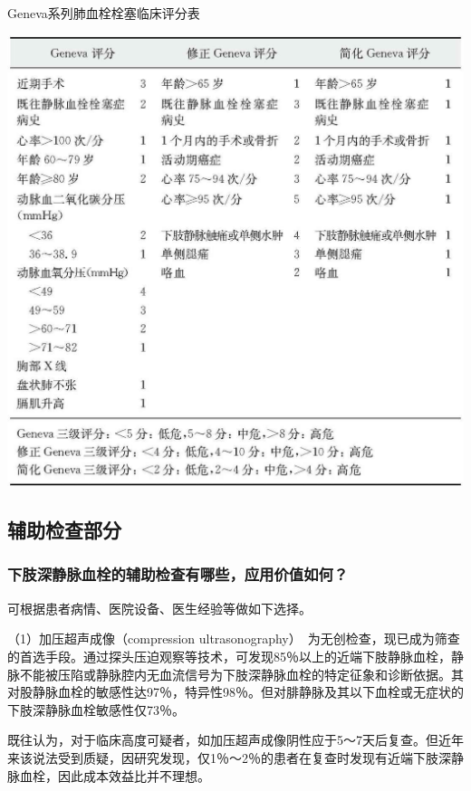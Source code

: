 \begin{table}[htbp]
\centering
\caption{Geneva系列肺血栓栓塞临床评分表}
\label{tab16-7}
\includegraphics[width=\textwidth,height=\textheight,keepaspectratio]{./images/Image00124.jpg}
\end{table}

\subsection{辅助检查部分}

\subsubsection{下肢深静脉血栓的辅助检查有哪些，应用价值如何？}

可根据患者病情、医院设备、医生经验等做如下选择。

（1）加压超声成像（compression
ultrasonography）　为无创检查，现已成为筛查的首选手段。通过探头压迫观察等技术，可发现85％以上的近端下肢静脉血栓，静脉不能被压陷或静脉腔内无血流信号为下肢深静脉血栓的特定征象和诊断依据。其对股静脉血栓的敏感性达97％，特异性98％。但对腓静脉及其以下血栓或无症状的下肢深静脉血栓敏感性仅73％。

既往认为，对于临床高度可疑者，如加压超声成像阴性应于5～7天后复查。但近年来该说法受到质疑，因研究发现，仅1％～2％的患者在复查时发现有近端下肢深静脉血栓，因此成本效益比并不理想。

